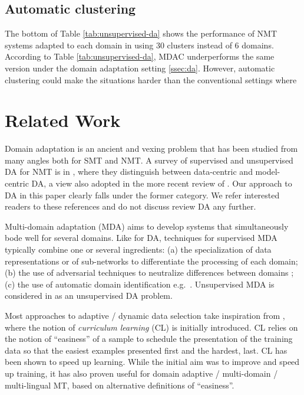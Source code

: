 \documentclass[11pt]{article}
\begin{document}
\subsection{Automatic clustering}\label{ssec:clda}
The bottom of Table \ref{tab:unsupervised-da} shows the performance of NMT systems adapted to each domain in using 30 clusters instead of 6 domains. According to Table \ref{tab:unsupervised-da}, MDAC underperforms the same version under the domain adaptation setting \ref{ssec:da}. However, automatic clustering could make the situations harder than the conventional settings where 
\section{Related Work \label{sec:related}}

Domain adaptation is an ancient and vexing problem that has been studied from many angles both for SMT and NMT. A survey of supervised and unsupervised DA for NMT is in \citet{Chu18asurvey}, where they distinguish between data-centric and model-centric DA, a view also adopted in the more recent review of \citet{Saunders21domain}. Our approach to DA in this paper clearly falls under the former category. We refer interested readers to these references and do not discuss review DA any further.

Multi-domain adaptation (MDA) aims to develop systems that simultaneously bode well for several domains. Like for DA, techniques for supervised MDA typically combine one or several ingredients: (a) the specialization of data representations \citep{Kobus17domaincontrol} or of sub-networks \citep{Pham19generic} to differentiate the processing of each domain; (b) the use of adversarial techniques to neutralize differences between domains \cite{Britz17mixing,Zeng18multidomain}; (c) the use of automatic domain identification e.g.\ \citet{Jiang19multidomain}. Unsupervised MDA is considered in \citet{Farajian17multidomain} as an unsupervised DA problem.

Most approaches to adaptive / dynamic data selection take inspiration from \citet{Bengio09curriculum}, where the notion of \emph{curriculum learning} (CL) is initially introduced. CL relies on the notion of ``easiness'' of a sample to schedule the presentation of the training data so that the easiest examples presented first and the hardest, last. CL has been shown to speed up learning. While the initial aim was to improve and speed up training, it has also proven useful for domain adaptive / multi-domain / multi-lingual MT, based on alternative definitions of ``easiness''.
\end{document}
